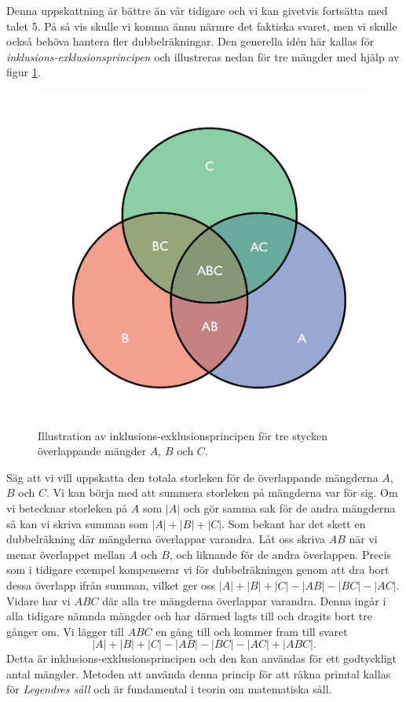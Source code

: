 Denna uppskattning är bättre än vår tidigare och vi kan givetvis fortsätta med talet 5.
På så vis skulle vi komma ännu närmre det faktiska svaret, 
men vi skulle också behöva hantera fler dubbelräkningar.
Den generella idén här kallas för \textit{inklusions-exklusionsprincipen} och illustreras nedan för tre mängder med hjälp av figur \ref{pop.fig}.
\begin{figure}[H]
    \centering
    \includegraphics[scale=0.3]{erik/Images/Venndiagram.pdf}
    \caption{Illustration av inklusions-exklusionsprincipen för tre stycken överlappande mängder $A$, $B$ och $C$.}
    \label{pop.fig}
\end{figure}
Säg att vi vill uppskatta den totala storleken för de överlappande mängderna $A$, $B$ och $C$. 
Vi kan börja med att summera storleken på mängderna var för sig.
Om vi betecknar storleken på $A$ som $|A|$ och gör samma sak för de andra mängderna så kan vi skriva summan som $|A|+|B|+|C|$.
Som bekant har det skett en dubbelräkning där mängderna överlappar varandra.
Låt oss skriva $AB$ när vi menar överlappet mellan $A$ och $B$, och liknande för de andra överlappen.
Precis som i tidigare exempel kompenserar vi för dubbelräkningen genom att dra bort dessa överlapp ifrån summan, vilket ger oss $|A|+|B|+|C|-|AB|-|BC|-|AC|$.
Vidare har vi $ABC$ där alla tre mängderna överlappar varandra.
Denna ingår i alla tidigare nämnda mängder och har därmed lagts till och dragits bort tre gånger om. 
Vi lägger till $ABC$ en gång till och kommer fram till svaret
\begin{equation*}
    |A|+|B|+|C|-|AB|-|BC|-|AC|+|ABC|.
\end{equation*}
Detta är inklusions-exklusionsprincipen och den kan användas för ett godtyckligt antal mängder.
Metoden att använda denna princip för att räkna primtal kallas för \textit{Legendres såll} och är fundamental i teorin om matematiska såll.


